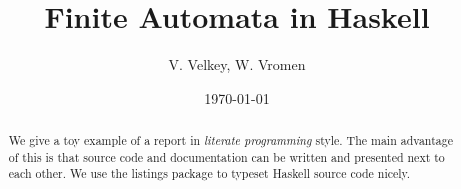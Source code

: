 \documentclass[12pt,a4paper]{article}
\title{Finite Automata in Haskell}
\author{V. Velkey, W. Vromen}
\date{\today}
\begin{document}
\maketitle

\begin{abstract}
We give a toy example of a report in \emph{literate programming} style.
The main advantage of this is that source code and documentation can
be written and presented next to each other.
We use the listings package to typeset Haskell source code nicely.
\end{abstract}

\vfill

\tableofcontents

\clearpage
















\end{document}
